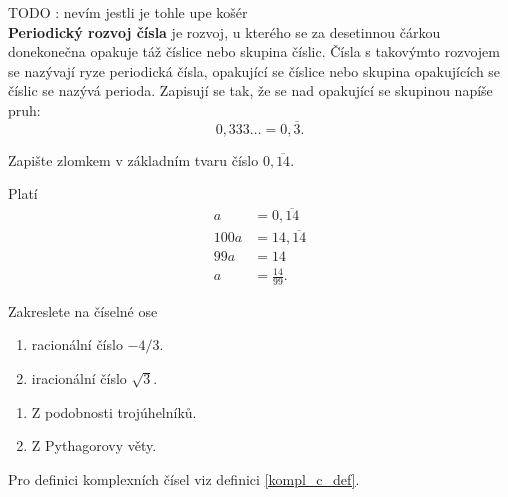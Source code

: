 \begin{definition}
  TODO : nevím jestli je tohle upe košér\\
  \textbf{Periodický rozvoj čísla} je rozvoj, u kterého se za desetinnou čárkou donekonečna opakuje táž číslice nebo skupina číslic. Čísla s takovýmto rozvojem se nazývají ryze periodická čísla, opakující se číslice nebo skupina opakujících se číslic se nazývá perioda. Zapisují se tak, že se nad opakující se skupinou napíše pruh:
  $$0,333 … = 0,\overline{3}.$$
\end{definition}

\begin{priklad}
    Zapište zlomkem v základním tvaru číslo $0,\overline{14}.$
\end{priklad}

\begin{reseni}
    Platí
    \begin{align*}
        a&=0,\overline{14}\\
        100a &= 14,\overline{14} \\
        99a &= 14\\
        a &= \frac{14}{99}.
    \end{align*}
\end{reseni}

\begin{priklad}
    Zakreslete na číselné ose
    \begin{enumerate}[$a.$]
    \item racionální číslo $-4/3.$
   	\item iracionální číslo $\sqrt{3}. $
    \end{enumerate}
\end{priklad}

\begin{reseni}
\begin{enumerate}[$a.$]
\item Z podobnosti trojúhelníků.
\item Z Pythagorovy věty.
\end{enumerate}
\end{reseni}

\begin{pozn}
    Pro definici komplexních čísel viz definici \ref{kompl_c_def}.
\end{pozn}

